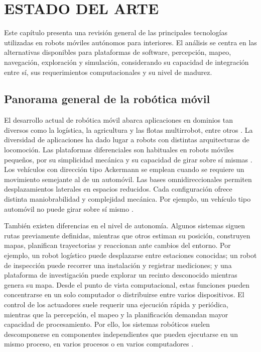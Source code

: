 \chapter{ESTADO DEL ARTE}
\label{ch:estado_arte}

Este capítulo presenta una revisión general de las principales tecnologías
utilizadas en robots móviles autónomos para interiores. El análisis se centra
en las alternativas disponibles para plataformas de software, percepción,
mapeo, navegación, exploración y simulación, considerando su capacidad de
integración entre sí, sus requerimientos computacionales y su nivel de
madurez.

\section{Panorama general de la robótica móvil}
\label{sec:panorama_robotica_movil}

El desarrollo actual de robótica móvil abarca aplicaciones en dominios tan diversos como la logística, la agricultura y las flotas multirrobot, entre otros \citep{macenski2023desks}. La diversidad de aplicaciones ha dado lugar a
robots con distintas arquitecturas de locomoción. Las plataformas diferenciales son habituales en robots móviles pequeños, por su simplicidad mecánica y su capacidad de girar sobre sí mismas \parencites[Sec.~4.1]{corke2023}{ferreira2023differential}. Los
vehículos con dirección tipo Ackermann se emplean cuando se requiere un
movimiento semejante al de un automóvil. Las bases omnidireccionales
permiten desplazamientos laterales en espacios reducidos. Cada configuración ofrece
distinta maniobrabilidad y complejidad mecánica. Por ejemplo, un vehículo tipo
automóvil no puede girar sobre sí mismo \citep[Sec.~4.1]{corke2023}.

También existen diferencias en el nivel de autonomía. Algunos sistemas siguen
rutas previamente definidas, mientras que otros estiman su posición,
construyen mapas, planifican trayectorias y reaccionan ante cambios del
entorno. Por ejemplo, un robot logístico puede desplazarse entre estaciones
conocidas; un robot de inspección puede recorrer una instalación y registrar
mediciones; y una plataforma de investigación puede explorar un recinto
desconocido mientras genera su mapa.
Desde el punto de vista computacional, estas funciones pueden concentrarse en
un solo computador o distribuirse entre varios dispositivos. El control de
los actuadores suele requerir una ejecución rápida y periódica, mientras que
la percepción, el mapeo y la planificación demandan mayor capacidad de
procesamiento. Por ello, los sistemas robóticos suelen descomponerse en componentes
independientes que pueden ejecutarse en un mismo proceso, en varios procesos o en
varios computadores \citep{macenski2022ros2}.


